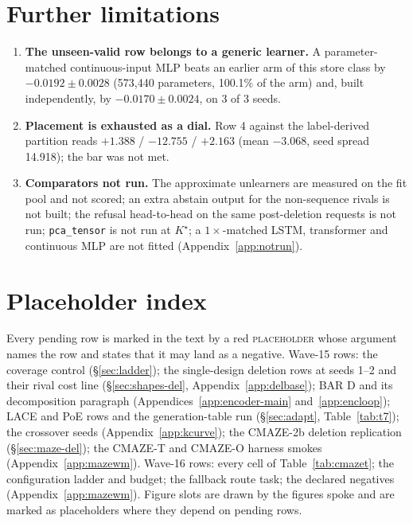 \documentclass{article}
\newcommand{\Kstar}{\ensuremath{K^{\star}}}
\begin{document}
\section{Further limitations}
\label{app:morelimits}
\begin{enumerate}[leftmargin=*,itemsep=1pt]
\item \textbf{The unseen-valid row belongs to a generic learner.} A parameter-matched
  continuous-input MLP beats an earlier arm of this store class by $-0.0192\pm0.0028$ (573,440
  parameters, 100.1\% of the arm) and, built independently, by $-0.0170\pm0.0024$, on 3 of 3
  seeds.
\item \textbf{Placement is exhausted as a dial.} Row 4 against the label-derived partition reads
  $+1.388$ / $-12.755$ / $+2.163$ (mean $-3.068$, seed spread 14.918); the bar was not met.
\item \textbf{Comparators not run.} The approximate unlearners are measured on the fit pool and
  not scored; an extra abstain output for the non-sequence rivals is not built; the refusal
  head-to-head on the same post-deletion requests is not run; \texttt{pca\_tensor} is not run at
  $\Kstar$; a $1\times$-matched LSTM, transformer and continuous MLP are not fitted
  (Appendix~\ref{app:notrun}).
\end{enumerate}

\section{Placeholder index}
\label{app:placeholders}

Every pending row is marked in the text by a red \textsc{placeholder} whose argument names the row
and states that it may land as a negative. Wave-15 rows: the coverage control
(\S\ref{sec:ladder}); the single-design deletion rows at seeds 1--2 and their rival cost line
(\S\ref{sec:shapes-del}, Appendix~\ref{app:delbase}); BAR D and its decomposition paragraph
(Appendices~\ref{app:encoder-main} and~\ref{app:encloop}); LACE and PoE rows and the generation-table run
(\S\ref{sec:adapt}, Table~\ref{tab:t7}); the crossover seeds (Appendix~\ref{app:kcurve}); the CMAZE-2b
deletion replication (\S\ref{sec:maze-del}); the CMAZE-T and CMAZE-O harness smokes
(Appendix~\ref{app:mazewm}). Wave-16 rows: every cell of Table~\ref{tab:cmazet}; the configuration ladder and budget; the fallback route task; the declared
negatives (Appendix~\ref{app:mazewm}). Figure slots are drawn by the figures spoke and are marked as
placeholders where they depend on pending rows.
\end{document}
